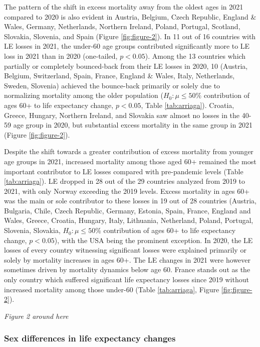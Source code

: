 \documentclass[12pt]{article}
\begin{document}
The pattern of the shift in excess mortality away from the oldest ages in 2021 compared to 2020 is also evident in Austria, Belgium, Czech Republic, England \& Wales, Germany, Netherlands, Northern Ireland, Poland, Portugal, Scotland, Slovakia, Slovenia, and Spain (Figure \ref{fig:figure-2}). In 11 out of 16 countries with LE losses in 2021, the under-60 age groups contributed significantly more to LE loss in 2021 than in 2020 (one-tailed, $p<0.05$).
Among the 13 countries which partially or completely bounced-back from their LE losses in 2020, 10 (Austria, Belgium, Switzerland, Spain, France, England \& Wales, Italy, Netherlands, Sweden, Slovenia) achieved the bounce-back primarily or solely due to normalizing mortality among the older population ($H_0: \mu \leq 50\%$ contribution of ages 60+ to life expectancy change, $p<0.05$, Table \ref{tab:arriaga}).
Croatia, Greece, Hungary, Northern Ireland, and Slovakia saw almost no losses in the 40-59 age group in 2020, but substantial excess mortality in the same group in 2021 (Figure \ref{fig:figure-2}).

Despite the shift towards a greater contribution of excess mortality from younger age groups in 2021, increased mortality among those aged 60+ remained the most important contributor to LE losses compared with pre-pandemic levels (Table \ref{tab:arriaga}). LE dropped in 28 out of the 29 countries analyzed from 2019 to 2021, with only Norway exceeding the 2019 levels.
Excess mortality in ages 60+ was the main or sole contributor to these losses in 19 out of 28 countries (Austria, Bulgaria, Chile, Czech Republic, Germany, Estonia, Spain, France, England and Wales, Greece, Croatia, Hungary, Italy, Lithuania, Netherland, Poland, Portugal, Slovenia, Slovakia, $H_0: \mu \leq 50\%$ contribution of ages 60+ to life expectancy change, $p<0.05$), with the USA being the prominent exception.
In 2020, the LE losses of every country witnessing significant losses were explained primarily or solely by mortality increases in ages 60+.
The LE changes in 2021 were however sometimes driven by mortality dynamics below age 60. France stands out as the only country which suffered significant life expectancy losses since 2019 without increased mortality among those under-60 (Table \ref{tab:arriaga}, Figure \ref{fig:figure-2}).

\par\medskip
\emph{Figure 2 around here}
\par\medskip

\subsubsection*{Sex differences in life expectancy changes}
\end{document}
